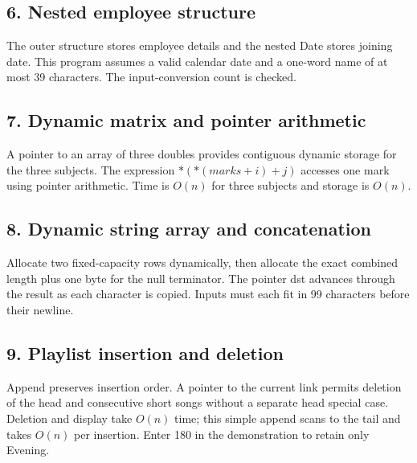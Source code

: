 \documentclass[11pt,a4paper]{article}
\begin{document}
\noindent\begin{minipage}{\linewidth}\subsection*{6. Nested employee structure}
The outer structure stores employee details and the nested Date stores joining date. This program assumes a valid calendar date and a one-word name of at most 39 characters. The input-conversion count is checked.

\end{minipage}\par\medskip
\noindent\begin{minipage}{\linewidth}\subsection*{7. Dynamic matrix and pointer arithmetic}
A pointer to an array of three doubles provides contiguous dynamic storage for the three subjects. The expression $*(*(marks+i)+j)$ accesses one mark using pointer arithmetic. Time is $O(n)$ for three subjects and storage is $O(n)$.

\end{minipage}\par\medskip
\noindent\begin{minipage}{\linewidth}\subsection*{8. Dynamic string array and concatenation}
Allocate two fixed-capacity rows dynamically, then allocate the exact combined length plus one byte for the null terminator. The pointer dst advances through the result as each character is copied. Inputs must each fit in 99 characters before their newline.

\end{minipage}\par\medskip
\noindent\begin{minipage}{\linewidth}\subsection*{9. Playlist insertion and deletion}
Append preserves insertion order. A pointer to the current link permits deletion of the head and consecutive short songs without a separate head special case. Deletion and display take $O(n)$ time; this simple append scans to the tail and takes $O(n)$ per insertion. Enter 180 in the demonstration to retain only Evening.

\end{minipage}\par\medskip
\end{document}
